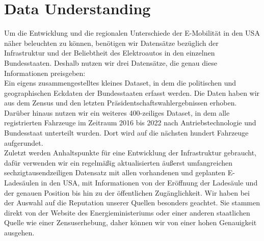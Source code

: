 \section{Data Understanding}

Um die Entwicklung und die regionalen Unterschiede der E-Mobilität in den USA näher beleuchten zu können, benötigen wir Datensätze bezüglich der Infrastruktur und der Beliebtheit des Elektroautos in den einzelnen Bundesstaaten. Deshalb nutzen wir drei Datensätze, die genau diese Informationen preisgeben: \\
Ein eigens zusammengestelltes kleines Dataset, in dem die politischen und geographischen Eckdaten der Bundesstaaten erfasst werden. Die Daten haben wir aus dem Zensus und den letzten Präsidentschaftswahlergebnissen erhoben. \\
Darüber hinaus nutzen wir ein weiteres 400-zeiliges Dataset, in dem alle registrierten Fahrzeuge im Zeitraum 2016 bis 2022 nach Antriebstechnologie und Bundesstaat unterteilt wurden. Dort wird auf die nächsten hundert Fahrzeuge aufgerundet. \\
Zuletzt werden Anhaltspunkte für eine Entwicklung der Infrastruktur gebraucht, dafür verwenden wir ein regelmäßig aktualisierten äußerst umfangreichen sechzigtausendzeiligen Datensatz mit allen vorhandenen und geplanten E-Ladesäulen in den USA, mit Informationen von der Eröffnung der Ladesäule und der genauen Position bis hin zu der öffentlichen Zugänglichkeit.
Wir haben bei der Auswahl auf die Reputation unserer Quellen besonders geachtet. Sie stammen direkt von der Website des Energieministeriums oder einer anderen staatlichen Quelle wie einer Zensuserhebung, daher können wir von einer hohen Genauigkeit ausgehen.